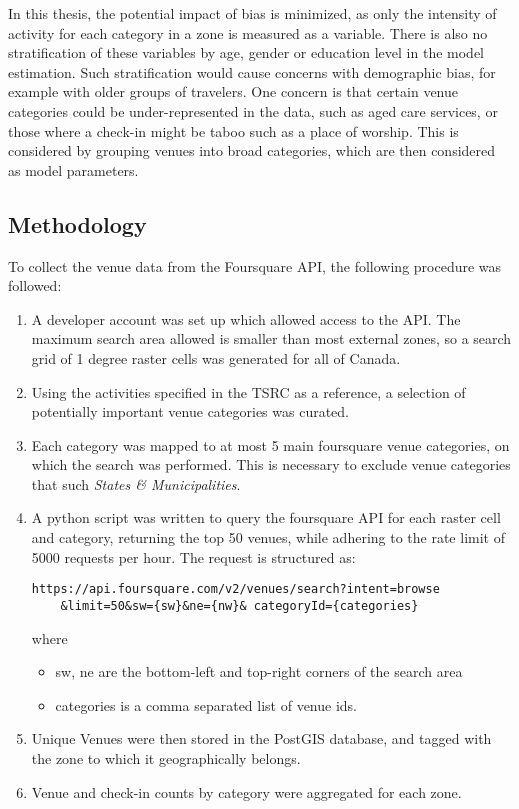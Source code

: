 In this thesis, the potential impact of bias is minimized, as only the intensity of activity for each category in a zone is measured as a variable. There is also no stratification of these variables by age, gender or education level in the model estimation. Such stratification would cause concerns with demographic bias, for example with older groups of travelers. One concern is that certain venue categories could be under-represented in the data, such as aged care services, or those where a check-in might be taboo such as a place of worship. This is considered by grouping venues into broad categories, which are then considered as model parameters.
	
\subsection{Methodology}
To collect the venue data from the Foursquare API, the following procedure was followed:
\begin{enumerate}

\item A developer account was set up which allowed access to the API. The maximum search area allowed is smaller than most external zones, so a search grid of 1 degree raster cells was generated for all of Canada. 

\item Using the activities specified in the TSRC as a reference, a selection of potentially important venue categories was curated. 

\item Each category was mapped to at most 5 main foursquare venue categories, on which the search was performed. This is necessary to exclude venue categories that such \textit{States \& Municipalities}.

\item A python script was written to query the foursquare API for each raster cell and category, returning the top 50 venues, while adhering to the rate limit of 5000 requests per hour. The request is structured as:
\begin{verbatim}
https://api.foursquare.com/v2/venues/search?intent=browse
    &limit=50&sw={sw}&ne={nw}& categoryId={categories}
\end{verbatim}
where 
\begin{itemize}
\item sw, ne are the bottom-left and top-right corners of the search area
\item categories is a comma separated list of venue ids.
\end{itemize}

\item Unique Venues were then stored in the PostGIS database, and tagged with the zone to which it geographically belongs.
\item Venue and check-in counts by category were aggregated for each zone.
\end{enumerate}

